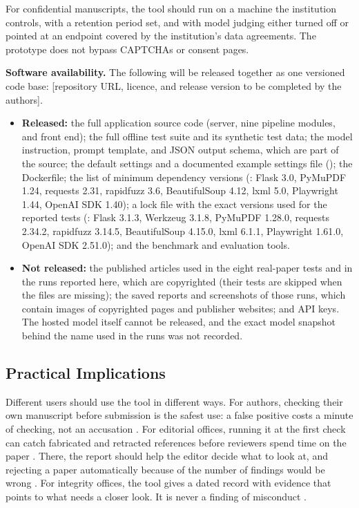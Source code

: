 \documentclass{article}
\newcommand{\vd}[1]{\texttt{\detokenize{#1}}}
\begin{document}
For confidential manuscripts, the tool should run on a machine the institution controls, with a retention period set, and with model judging either turned off or pointed at an endpoint covered by the institution's data agreements. The prototype does not bypass CAPTCHAs or consent pages.

\textbf{Software availability.} The following will be released together as one versioned code base: [repository URL, licence, and release version to be completed by the authors].

\begin{itemize}
\item \textbf{Released:} the full application source code (server, nine pipeline modules, and front end); the full offline test suite and its synthetic test data; the model instruction, prompt template, and JSON output schema, which are part of the source; the default settings and a documented example settings file (\vd{.env.example}); the Dockerfile; the list of minimum dependency versions (\vd{requirements.txt}: Flask 3.0, PyMuPDF 1.24, requests 2.31, rapidfuzz 3.6, BeautifulSoup 4.12, lxml 5.0, Playwright 1.44, OpenAI SDK 1.40); a lock file with the exact versions used for the reported tests (\vd{requirements-lock.txt}: Flask 3.1.3, Werkzeug 3.1.8, PyMuPDF 1.28.0, requests 2.34.2, rapidfuzz 3.14.5, BeautifulSoup 4.15.0, lxml 6.1.1, Playwright 1.61.0, OpenAI SDK 2.51.0); and the benchmark and evaluation tools.
\item \textbf{Not released:} the published articles used in the eight real-paper tests and in the runs reported here, which are copyrighted (their tests are skipped when the files are missing); the saved reports and screenshots of those runs, which contain images of copyrighted pages and publisher websites; and API keys. The hosted model itself cannot be released, and the exact model snapshot behind the name used in the runs was not recorded.
\end{itemize}

\subsection{Practical Implications}

Different users should use the tool in different ways. For authors, checking their own manuscript before submission is the safest use: a false positive costs a minute of checking, not an accusation \cite{jergas2015,walters2023}. For editorial offices, running it at the first check can catch fabricated and retracted references before reviewers spend time on the paper \cite{aczel2021,vannoorden2023}. There, the report should help the editor decide what to look at, and rejecting a paper automatically because of the number of findings would be wrong \cite{hicks2015}. For integrity offices, the tool gives a dated record with evidence that points to what needs a closer look. It is never a finding of misconduct \cite{cope2019,icmje2025}.
\end{document}
